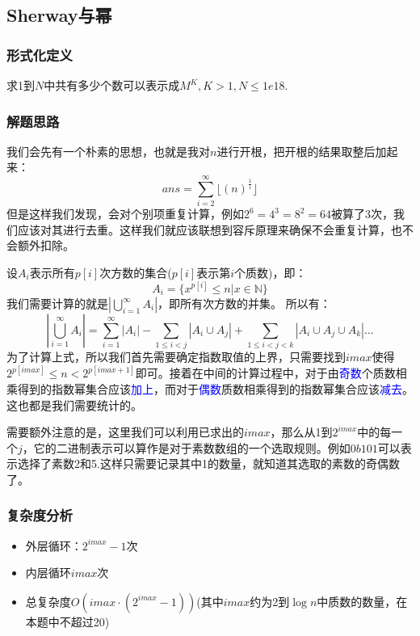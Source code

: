 \documentclass[../mainReport.tex]{subfiles}
\begin{document}
\subsection{Sherway与幂}
\subsubsection{形式化定义}
求1到$N$中共有多少个数可以表示成$M^K, K>1, N\le 1e18$.
\subsubsection{解题思路}
我们会先有一个朴素的思想，也就是我对$n$进行开根，把开根的结果取整后加起来：
$$
ans=\sum_{i=2}^{\infty}\lfloor(n)^{\frac{1}{i}}\rfloor
$$
但是这样我们发现，会对个别项重复计算，例如$2^6=4^3=8^2=64$被算了3次，我们应该对其进行去重。这样我们就应该联想到容斥原理来确保不会重复计算，也不会额外扣除。

设$A_i$表示所有$p[i]$次方数的集合($p[i]$表示第$i$个质数)，即：
\[
    A_i=\{x^{p[i]}\le n|x\in\mathbb{N}\}
\]
我们需要计算的就是$|\bigcup_{i=1}^{\infty}A_i|$，即所有次方数的并集。
所以有：
\begin{equation*}
    |\bigcup_{i=1}^{\infty}A_i|=\sum_{i=1}^{\infty}|A_i|
    -\sum_{1\le i<j}|A_i\cup A_j|
    +\sum_{1\le i<j<k}|A_i\cup A_j\cup A_k|\dots
\end{equation*}
为了计算上式，所以我们首先需要确定指数取值的上界，只需要找到$imax$使得$2^{p[imax]}\le n < 2^{p[imax+1]}$即可。接着在中间的计算过程中，对于由\textcolor{blue}{奇数}个质数相乘得到的指数幂集合应该\textcolor{blue}{加上}，而对于\textcolor{blue}{偶数}质数相乘得到的指数幂集合应该\textcolor{blue}{减去}。这也都是我们需要统计的。

需要额外注意的是，这里我们可以利用已求出的$imax$，那么从1到$2^{imax}$中的每一个$j$，它的二进制表示可以算作是对于素数数组的一个选取规则。例如$0b101$可以表示选择了素数2和5.这样只需要记录其中1的数量，就知道其选取的素数的奇偶数了。

\subsubsection{复杂度分析}
\begin{itemize}
    \item 外层循环：$2^{imax}-1$次
    \item 内层循环$imax$次
    \item 总复杂度$O(imax \cdot (2^{imax}-1))$(其中$imax$约为2到$\log n$中质数的数量，在本题中不超过20)
\end{itemize}
\end{document}
